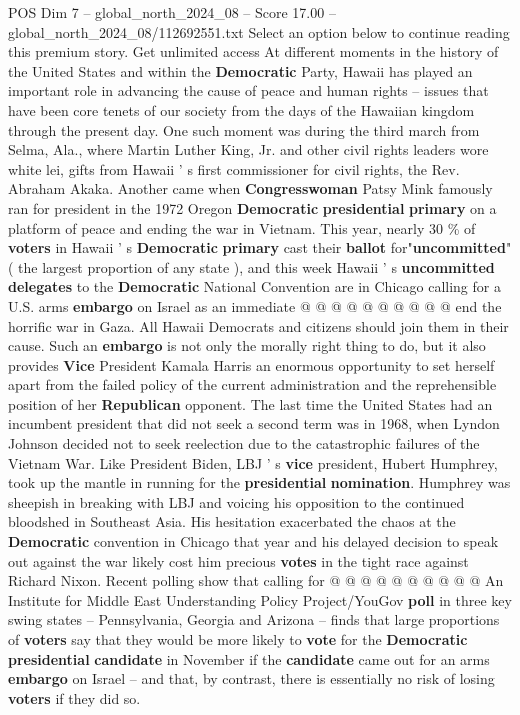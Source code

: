 \begin{textsample}{POS Dim 7 – global\_north\_2024\_08 – Score 17.00 – global\_north\_2024\_08/112692551.txt}  \label{ex:f7_pos_001}
Select an option below to continue reading this premium story.
Get unlimited access At different moments in the history of the United States and within the \textbf{Democratic} Party, Hawaii has played an important role in advancing the cause of peace and human rights -- issues that have been core tenets of our society from the days of the Hawaiian kingdom through the present day.
One such moment was during the third march from Selma, Ala., where Martin Luther King, Jr. and other civil rights leaders wore white lei, gifts from Hawaii ' s first commissioner for civil rights, the Rev.
Abraham Akaka.
Another came when \textbf{Congresswoman} Patsy Mink famously ran for president in the 1972 Oregon \textbf{Democratic} \textbf{presidential} \textbf{primary} on a platform of peace and ending the war in Vietnam.
This year, nearly 30 \% of \textbf{voters} in Hawaii ' s \textbf{Democratic} \textbf{primary} cast their \textbf{ballot} for"\textbf{uncommitted}"( the largest proportion of any state ), and this week Hawaii ' s \textbf{uncommitted} \textbf{delegates} to the \textbf{Democratic} National Convention are in Chicago calling for a U.S. arms \textbf{embargo} on Israel as an immediate @ @ @ @ @ @ @ @ @ @ end the horrific war in Gaza.
All Hawaii Democrats and citizens should join them in their cause.
Such an \textbf{embargo} is not only the morally right thing to do, but it also provides \textbf{Vice} President Kamala Harris an enormous opportunity to set herself apart from the failed policy of the current administration and the reprehensible position of her \textbf{Republican} opponent.
The last time the United States had an incumbent president that did not seek a second term was in 1968, when Lyndon Johnson decided not to seek reelection due to the catastrophic failures of the Vietnam War.
Like President Biden, LBJ ' s \textbf{vice} president, Hubert Humphrey, took up the mantle in running for the \textbf{presidential} \textbf{nomination}.
Humphrey was sheepish in breaking with LBJ and voicing his opposition to the continued bloodshed in Southeast Asia.
His hesitation exacerbated the chaos at the \textbf{Democratic} convention in Chicago that year and his delayed decision to speak out against the war likely cost him precious \textbf{votes} in the tight race against Richard Nixon.
Recent polling show that calling for @ @ @ @ @ @ @ @ @ @ An Institute for Middle East Understanding Policy Project/YouGov \textbf{poll} in three key swing states -- Pennsylvania, Georgia and Arizona -- finds that large proportions of \textbf{voters} say that they would be more likely to \textbf{vote} for the \textbf{Democratic} \textbf{presidential} \textbf{candidate} in November if the \textbf{candidate} came out for an arms \textbf{embargo} on Israel -- and that, by contrast, there is essentially no risk of losing \textbf{voters} if they did so.

\end{textsample}
